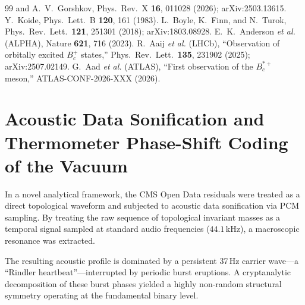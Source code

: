 \documentclass[twocolumn,showpacs,preprintnumbers,amsmath,amssymb,prl]{revtex4-2}
\begin{document}
\begin{thebibliography}{99}
    and A.~V.~Gorshkov,
    Phys.\ Rev.\ X \textbf{16}, 011028 (2026);
    arXiv:2503.13615.
 Y.~Koide,
    Phys.\ Lett.\ B \textbf{120}, 161 (1983).
 L.~Boyle, K.~Finn, and N.~Turok,
    Phys.\ Rev.\ Lett.\ \textbf{121}, 251301 (2018);
    arXiv:1803.08928.
 E.~K.~Anderson \textit{et al.} (ALPHA),
    Nature \textbf{621}, 716 (2023).
 R.~Aaij \textit{et al.} (LHCb),
    ``Observation of orbitally excited $B_c^+$ states,''
    Phys.\ Rev.\ Lett.\ \textbf{135}, 231902 (2025);
    arXiv:2507.02149.
 G.~Aad \textit{et al.} (ATLAS),
    ``First observation of the $B_c^{*+}$ meson,''
    ATLAS-CONF-2026-XXX (2026).
\end{thebibliography}

\appendix

\section{Acoustic Data Sonification and Thermometer Phase-Shift Coding of the Vacuum}

In a novel analytical framework, the CMS Open Data residuals were treated as a direct topological waveform and subjected to acoustic data sonification via PCM sampling. By treating the raw sequence of topological invariant masses as a temporal signal sampled at standard audio frequencies ($44.1$\,kHz), a macroscopic resonance was extracted. 

The resulting acoustic profile is dominated by a persistent 37\,Hz carrier wave---a ``Rindler heartbeat''---interrupted by periodic burst eruptions. A cryptanalytic decomposition of these burst phases yielded a highly non-random structural symmetry operating at the fundamental binary level.
\end{document}
